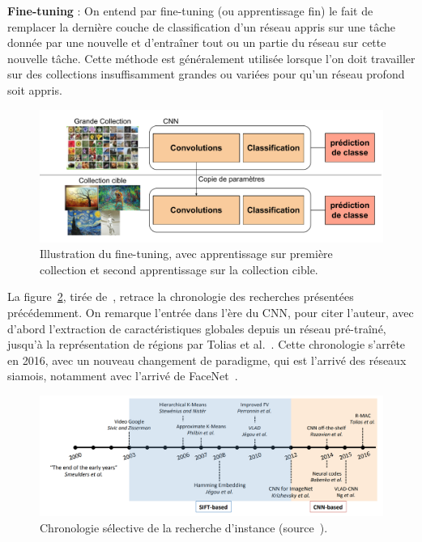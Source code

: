 \begin{oframed}
\textbf{Fine-tuning} : On entend par fine-tuning (ou apprentissage fin) le fait de remplacer la dernière couche de classification d'un réseau appris sur une tâche donnée par une nouvelle et d'entraîner tout ou un partie du réseau sur cette nouvelle tâche. Cette méthode est généralement utilisée lorsque l'on doit travailler sur des collections insuffisamment grandes ou variées pour qu'un réseau profond soit appris.
\end{oframed}


\begin{figure}[ht!]
\centering
\includegraphics[width=\columnwidth]{figures/finetuning.pdf}%
\caption{Illustration du fine-tuning, avec apprentissage sur première collection et second apprentissage sur la collection cible.}
\label{fig:finetuning}
\end{figure}

La figure~\ref{fig:histoire}, tirée de~\cite{zheng2018sift}, retrace la chronologie des recherches présentées précédemment.
On remarque l'entrée dans l'ère du CNN, pour citer l'auteur, avec d'abord l'extraction de caractéristiques globales depuis un réseau pré-traîné, jusqu'à la représentation de régions par Tolias et al.~\cite{tolias2015particular}.
Cette chronologie s'arrête en 2016, avec un nouveau changement de paradigme, qui est l'arrivé des réseaux siamois, notamment avec l'arrivé de FaceNet~\cite{schroff2015facenet}.


\begin{figure}%
\centering
\includegraphics[width=\columnwidth]{figures/histoireRI.jpg}%
\caption{Chronologie sélective de la recherche d'instance (source~\cite{zheng2018sift}).}
\label{fig:histoire}
\end{figure}

